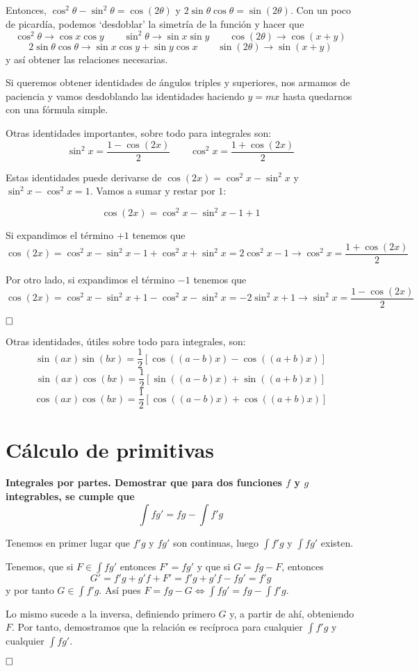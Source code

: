 \documentclass[a4paper]{article}
\newcommand{\qed}{\begin{flushright}
		{$\newline\square$}
	\end{flushright}}
\begin{document}
Entonces, $\cos^2\theta - \sin^2\theta = \cos(2\theta)$ y $2\sin\theta\cos\theta = \sin(2\theta)$. Con un poco de picardía, podemos `desdoblar' la simetría de la función y hacer que 
$$\cos^2\theta \rightarrow \cos x \cos y \qquad \sin^2\theta \rightarrow \sin x \sin y \qquad \cos(2\theta)\rightarrow \cos(x+y)$$
$$2\sin\theta\cos\theta \rightarrow \sin x\cos y + \sin y \cos x  \qquad \sin(2\theta) \rightarrow \sin(x+y)$$
y así obtener las relaciones necesarias.

Si queremos obtener identidades de ángulos triples y superiores, nos armamos de paciencia y vamos desdoblando las identidades haciendo $y = mx$ hasta quedarnos con una fórmula simple.

Otras identidades importantes, sobre todo para integrales son:
$$ \sin^2x = \frac{1-\cos(2x)}{2} \qquad \cos^2x = \frac{1+\cos(2x)}{2}$$

Estas identidades puede derivarse de $\cos(2x) = \cos^2x-\sin^2x$ y $\sin^2x-\cos^2x = 1$. Vamos a sumar y restar por $1$:

$$\cos(2x) = \cos^2x-\sin^2x -1+1$$

Si expandimos el término $+1$ tenemos que 
$$\cos(2x) = \cos^2x-\sin^2x-1+\cos^2x+\sin^2x = 2\cos^2x-1\rightarrow \cos^2x = \frac{1+\cos(2x)}{2}$$

Por otro lado, si expandimos el término $-1$ tenemos que
$$\cos(2x) = \cos^2x-\sin^2x+1-\cos^2x-\sin^2x = -2\sin^2x+1\rightarrow \sin^2x = \frac{1-\cos(2x)}{2}$$\qed

Otras identidades, útiles sobre todo para integrales, son:
$$ \sin(ax) \sin(bx) = \frac{1}{2}\left[\cos((a-b)x) - \cos((a+b)x)\right]$$
$$ \sin(ax) \cos(bx) = \frac{1}{2}\left[\sin((a-b)x) + \sin((a+b)x)\right]$$
$$ \cos(ax) \cos(bx) = \frac{1}{2}\left[\cos((a-b)x) + \cos((a+b)x)\right]$$
\section{Cálculo de primitivas}
\textbf{Integrales por partes. Demostrar que para dos funciones $f$ y $g$ integrables, se cumple que}
$$\int fg' = fg - \int f'g$$

Tenemos en primer lugar que $f'g$ y $fg'$ son continuas, luego $\int f'g$ y $\int fg'$ existen.

Tenemos, que si $F\in \int fg'$ entonces $F' = fg'$ y que si $ G = fg - F$, entonces
 $$G' = f'g + g'f + F' = f'g + g'f - fg' = f'g$$
 y por tanto $G \in \int f'g$. Así pues $F = fg-G \iff \int fg' = fg - \int f'g$.
 
 Lo mismo sucede a la inversa, definiendo primero $G$ y, a partir de ahí, obteniendo $F$. Por tanto, demostramos que la relación es recíproca para cualquier $\int f'g$ y cualquier $\int fg'$. \qed
 
\end{document}
